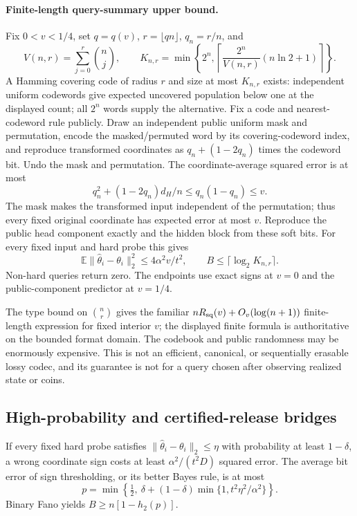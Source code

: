 \paragraph{Finite-length query-summary upper bound.}
Fix $0<v<1/4$, set $q=q(v)$, $r=\lfloor qn\rfloor$, $q_n=r/n$, and
\[
 V(n,r)=\sum_{j=0}^{r}\binom nj,\qquad
 K_{n,r}=\min\left\{2^n,
 \left\lceil\frac{2^n}{V(n,r)}(n\ln2+1)\right\rceil\right\}.
\]
A Hamming covering code of radius $r$ and size at most $K_{n,r}$ exists:
independent uniform codewords give expected uncovered population below
one at the displayed count; all $2^n$ words supply the alternative.
Fix a code and nearest-codeword rule publicly.  Draw an independent public
uniform mask and permutation, encode the masked/permuted word by its
covering-codeword index, and reproduce transformed coordinates as
$q_n+(1-2q_n)$ times the codeword bit.  Undo the mask and permutation.
The coordinate-average squared error is at most
\[
 q_n^2+(1-2q_n)d_H/n\le q_n(1-q_n)\le v.
\]
The mask makes the transformed input independent of the permutation; thus
every fixed original coordinate has expected error at most $v$.  Reproduce
the public head component exactly and the hidden block from these soft
bits.  For every fixed input and hard probe this gives
\[
 \mathbb E\|\widehat\theta_i-\theta_i\|_2^2
 \le4\alpha^2v/t^2,\qquad B\le\lceil\log_2K_{n,r}\rceil.
\]
Non-hard queries return zero.  The endpoints use exact signs at $v=0$ and
the public-component predictor at $v=1/4$.

The type bound on $\binom nr$ gives the familiar
$nR_{\rm sq}(v)+O_v(\log(n+1))$ finite-length expression for fixed interior
$v$; the displayed finite formula is authoritative on the bounded format
domain.  The codebook and public randomness may be enormously expensive.
This is not an efficient, canonical, or sequentially erasable lossy codec,
and its guarantee is not for a query chosen after observing realized
state or coins.

\subsection{High-probability and certified-release bridges}
If every fixed hard probe satisfies $\|\widehat\theta_i-\theta_i\|_2\le\eta$
with probability at least $1-\delta$, a wrong coordinate sign costs at
least $\alpha^2/(t^2D)$ squared error.  The average bit error of sign
thresholding, or its better Bayes rule, is at most
\[
 p=\min\left\{\tfrac12,\ \delta+(1-\delta)
                              \min\{1,t^2\eta^2/\alpha^2\}\right\}.
\]
Binary Fano yields $B\ge n[1-h_2(p)]$.

